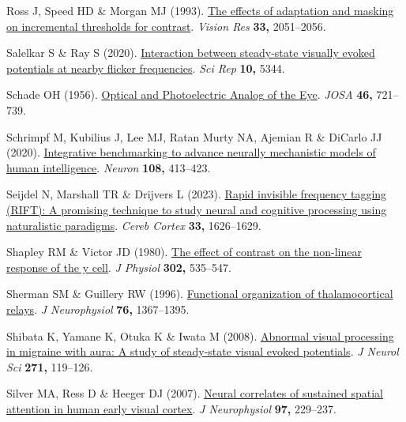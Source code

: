 \documentclass[
  letterpaper,
  DIV=11,
  numbers=noendperiod]{scrartcl}
\newlength{\cslhangindent}
\newenvironment{CSLReferences}[2] %
 {\begin{list}{}{%
  \setlength{\itemindent}{0pt}
  \setlength{\leftmargin}{0pt}
  \setlength{\parsep}{0pt}
  \ifodd #1
   \setlength{\leftmargin}{\cslhangindent}
   \setlength{\itemindent}{-1\cslhangindent}
  \fi
  \setlength{\itemsep}{#2\baselineskip}}}
 {\end{list}}
\begin{document}
\begin{CSLReferences}{1}{1}
Ross J, Speed HD \& Morgan MJ (1993).
\href{https://doi.org/10.1016/0042-6989(93)90003-f}{The effects of
adaptation and masking on incremental thresholds for contrast}.
\emph{Vision Res} \textbf{33,} 2051--2056.

Salelkar S \& Ray S (2020).
\href{https://doi.org/10.1038/s41598-020-62180-y}{Interaction between
steady-state visually evoked potentials at nearby flicker frequencies}.
\emph{Sci Rep} \textbf{10,} 5344.

Schade OH (1956). \href{https://doi.org/10.1364/JOSA.46.000721}{Optical
and {Photoelectric Analog} of the {Eye}}. \emph{JOSA} \textbf{46,}
721--739.

Schrimpf M, Kubilius J, Lee MJ, Ratan Murty NA, Ajemian R \& DiCarlo JJ
(2020). \href{https://doi.org/10.1016/j.neuron.2020.07.040}{Integrative
benchmarking to advance neurally mechanistic models of human
intelligence}. \emph{Neuron} \textbf{108,} 413--423.

Seijdel N, Marshall TR \& Drijvers L (2023).
\href{https://doi.org/10.1093/cercor/bhac160}{Rapid invisible frequency
tagging (RIFT): A promising technique to study neural and cognitive
processing using naturalistic paradigms}. \emph{Cereb Cortex}
\textbf{33,} 1626--1629.

Shapley RM \& Victor JD (1980).
\href{https://doi.org/10.1113/jphysiol.1980.sp013259}{The effect of
contrast on the non-linear response of the y cell}. \emph{J Physiol}
\textbf{302,} 535--547.

Sherman SM \& Guillery RW (1996).
\href{https://doi.org/10.1152/jn.1996.76.3.1367}{Functional organization
of thalamocortical relays}. \emph{J Neurophysiol} \textbf{76,}
1367--1395.

Shibata K, Yamane K, Otuka K \& Iwata M (2008).
\href{https://doi.org/10.1016/j.jns.2008.04.004}{Abnormal visual
processing in migraine with aura: A study of steady-state visual evoked
potentials}. \emph{J Neurol Sci} \textbf{271,} 119--126.

Silver MA, Ress D \& Heeger DJ (2007).
\href{https://doi.org/10.1152/jn.00677.2006}{Neural correlates of
sustained spatial attention in human early visual cortex}. \emph{J
Neurophysiol} \textbf{97,} 229--237.


\end{CSLReferences}
\end{document}
